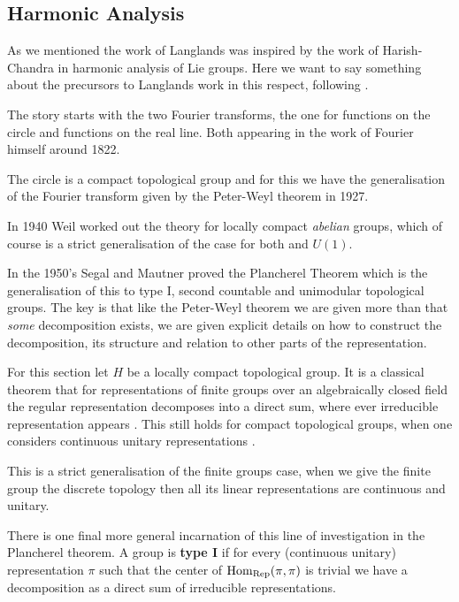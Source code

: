 \subsection{Harmonic Analysis}
As we mentioned the work of Langlands was inspired by the work of Harish-Chandra in harmonic analysis of Lie groups. Here we want to say something about the precursors to Langlands work in this respect, following \cite{follandCourseAbstractHarmonic2016}.

The story starts with the two Fourier transforms, the one for functions on the circle and functions on the real line. Both appearing in the work of Fourier himself around 1822. 

The circle is a compact topological group and for this we have the generalisation of the Fourier transform given by the Peter-Weyl theorem in 1927.

In 1940 Weil worked out the theory for locally compact \textit{abelian} groups, which of course is a strict generalisation of the case for both \R and \(U(1)\).

In the 1950's Segal and Mautner proved the Plancherel Theorem which is the generalisation of this to type I, second countable and unimodular topological groups. The key is that like the Peter-Weyl theorem we are given more than that \textit{some} decomposition exists, we are given explicit details on how to construct the decomposition, its structure and relation to other parts of the representation.

For this section let \(H\) be a locally compact topological group.
It is a classical theorem that for representations of finite groups over an algebraically closed field the regular representation decomposes into a direct sum, where ever irreducible representation appears \cite[Ch. 2.4 Cor. 2 ]{LinearRepresentationsFinite}. This still holds for compact topological groups, when one considers continuous unitary representations \cite[5.1]{follandCourseAbstractHarmonic2016}.
\begin{remark}
	This is a strict generalisation of the finite groups case, when we give the finite group the discrete topology then all its linear representations are continuous and unitary.
\end{remark}
There is one final more general incarnation of this line of investigation in the Plancherel theorem. A group is \textbf{type I} if for every (continuous unitary) representation \(\pi\) such that the center of \(\operatorname{Hom}_\mathrm{Rep}(\pi, \pi)\) is trivial we have a decomposition as a  direct sum of irreducible representations. 

